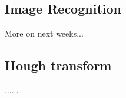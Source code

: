 \documentclass[11pt]{article}
\begin{document}
\subsection{Image Recognition}
More on next weeks...

\subsection{Hough transform}
......
\end{document}
